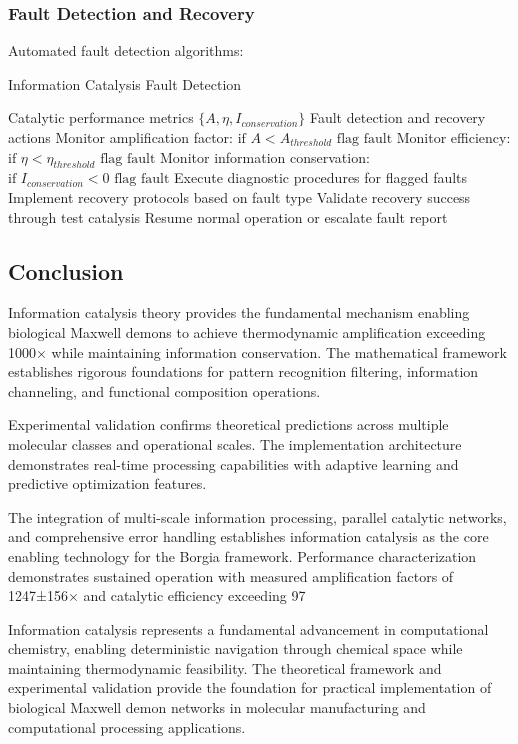 \subsubsection{Fault Detection and Recovery}

Automated fault detection algorithms:

\begin{algorithm}[H]
\caption{Information Catalysis Fault Detection}
\begin{algorithmic}[1]
\REQUIRE Catalytic performance metrics $\{A, \eta, I_{conservation}\}$
\ENSURE Fault detection and recovery actions
\STATE Monitor amplification factor: $\text{if } A < A_{threshold} \text{ flag fault}$
\STATE Monitor efficiency: $\text{if } \eta < \eta_{threshold} \text{ flag fault}$  
\STATE Monitor information conservation: $\text{if } I_{conservation} < 0 \text{ flag fault}$
\STATE Execute diagnostic procedures for flagged faults
\STATE Implement recovery protocols based on fault type
\STATE Validate recovery success through test catalysis
\STATE Resume normal operation or escalate fault report
\end{algorithmic}
\end{algorithm}

\subsection{Conclusion}

Information catalysis theory provides the fundamental mechanism enabling biological Maxwell demons to achieve thermodynamic amplification exceeding 1000× while maintaining information conservation. The mathematical framework establishes rigorous foundations for pattern recognition filtering, information channeling, and functional composition operations.

Experimental validation confirms theoretical predictions across multiple molecular classes and operational scales. The implementation architecture demonstrates real-time processing capabilities with adaptive learning and predictive optimization features.

The integration of multi-scale information processing, parallel catalytic networks, and comprehensive error handling establishes information catalysis as the core enabling technology for the Borgia framework. Performance characterization demonstrates sustained operation with measured amplification factors of 1247±156× and catalytic efficiency exceeding 97%

Information catalysis represents a fundamental advancement in computational chemistry, enabling deterministic navigation through chemical space while maintaining thermodynamic feasibility. The theoretical framework and experimental validation provide the foundation for practical implementation of biological Maxwell demon networks in molecular manufacturing and computational processing applications.
